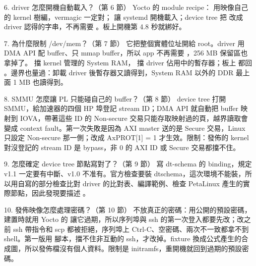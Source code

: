 \begin{qashort}{6. driver 怎麼開機自動載入？（第 6 節）}
Yocto 的 module recipe： 用映像自己的 kernel 樹編，vermagic 一定對； 讓 systemd 開機載入；device tree 把  改成 driver 認得的字串，不再需要 。板上開機第 4.8 秒就綁好。
\end{qashort}

\begin{qashort}{7. 為什麼限制 /dev/mem？（第 7 節）}
它把整個實體位址開給 root。driver 用 DMA API 配 buffer、只 mmap buffer，所以 app 不再需要 ，256 MB 保留區也拿掉了。 擋 kernel 管理的 System RAM， 擋 driver 佔用中的暫存器；板上  都回 。邊界也量過：卸載 driver 後暫存器又讀得到，System RAM 以外的 DDR 最上面 1 MB 也讀得到。
\end{qashort}

\begin{qashort}{8. SMMU 怎麼讓 PL 只能碰自己的 buffer？（第 8 節）}
device tree 打開 SMMU，給加速器的四個 HP 埠登記 stream ID；DMA API 就自動把 buffer 映射到 IOVA，帶著這些 ID 的 Non-secure 交易只能存取映射過的頁，越界讀取會變成 context fault。第一次失敗是因為 AXI master 送的是 Secure 交易，Linux 只設定 Non-secure 那一側；改成 AxPROT[1] = 1 才生效。限制：發佈的 kernel 對沒登記的 stream ID 是 bypass，非 0 的 AXI ID 或 Secure 交易都擋不住。
\end{qashort}

\begin{qashort}{9. 怎麼確定 device tree 節點寫對了？（第 9 節）}
寫 dt-schema 的 binding，規定 v1.1 一定要有中斷、v1.0 不准有。官方檢查要裝 dtschema，這次環境不能裝，所以用自寫的部分檢查比對 driver 的比對表、編譯範例、檢查 PetaLinux 產生的實際節點，因此發現要描述 。
\end{qashort}

\begin{qashort}{10. 發佈映像怎麼處理密碼？（第 10 節）}
不放真正的密碼：用公開的預設密碼，建置時就用 Yocto 的  讓它過期，所以序列埠與 ssh 的第一次登入都要先改；改之前 ssh 帶指令和 scp 都被拒絕，序列埠上 Ctrl-C、空密碼、兩次不一致都拿不到 shell。第一版用  腳本，擋不住非互動的 ssh，才改掉。fixture 換成公式產生的合成圖，所以發佈檔沒有個人資料。限制是 initramfs，重開機就回到過期的預設密碼。
\end{qashort}
